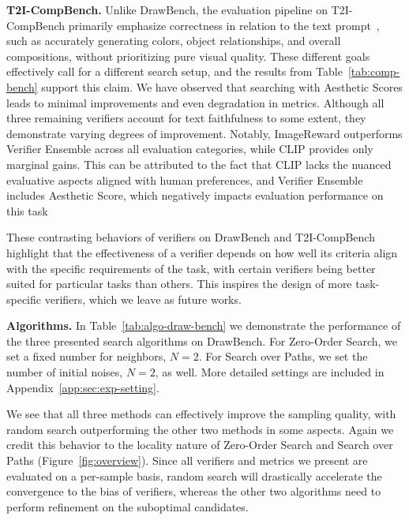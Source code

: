 \textbf{T2I-CompBench.} Unlike DrawBench, the evaluation pipeline on T2I-CompBench primarily emphasize correctness in relation to the text prompt~\citep{huang2023t2i}, such as accurately generating colors, object relationships, and overall compositions, without prioritizing pure visual quality. These different goals effectively call for a different search setup, and the results from Table~\ref{tab:comp-bench} support this claim. We have observed that searching with Aesthetic Scores leads to minimal improvements and even degradation in metrics. Although all three remaining verifiers account for text faithfulness to some extent, they demonstrate varying degrees of improvement. Notably, ImageReward outperforms Verifier Ensemble across all evaluation categories, while CLIP provides only marginal gains. This can be attributed to the fact that CLIP lacks the nuanced evaluative aspects aligned with human preferences, and Verifier Ensemble includes Aesthetic Score, which negatively impacts evaluation performance on this task


These contrasting behaviors of verifiers on DrawBench and T2I-CompBench highlight that the effectiveness of a verifier depends on how well its criteria align with the specific requirements of the task, with certain verifiers being better suited for particular tasks than others. This inspires the design of more task-specific verifiers, which we leave as future works.


\textbf{Algorithms.} In Table~\ref{tab:algo-draw-bench} we demonstrate the performance of the three presented search algorithms on DrawBench. For Zero-Order Search, we set a fixed number for neighbors, $N = 2$. For Search over Paths, we set the number of initial noises, $N = 2$, as well. More detailed settings are included in Appendix~\ref{app:sec:exp-setting}.


We see that all three methods can effectively improve the sampling quality, with random search outperforming the other two methods in some aspects. Again we credit this behavior to the locality nature of Zero-Order Search and Search over Paths (Figure~\ref{fig:overview}). Since all verifiers and metrics we present are evaluated on a per-sample basis, random search will drastically accelerate the convergence to the bias of verifiers, whereas the other two algorithms need to perform refinement on the suboptimal candidates. 


